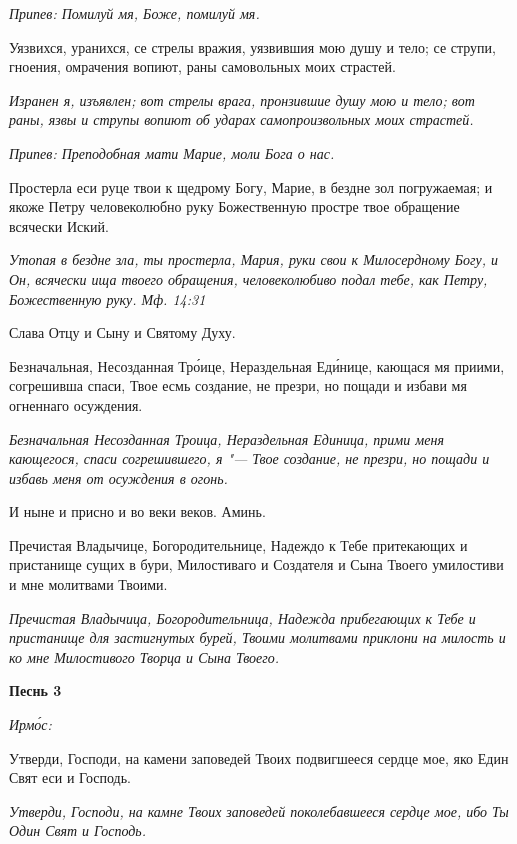 \itshape Припев:\normalfont{} Помилуй мя, Боже, помилуй мя.


Уязвихся, уранихся, се стрелы вражия, уязвившия мою душу и тело; се струпи, гноения, омрачения вопиют, раны самовольных моих страстей.


\itshape Изранен я, изъявлен; вот стрелы врага, пронзившие душу мою и тело; вот раны, язвы и струпы вопиют об ударах самопроизвольных моих страстей.\normalfont{}


\itshape Припев:\normalfont{} Преподобная мати Марие, моли Бога о нас.


Простерла еси руце твои к щедрому Богу, Марие, в бездне зол погружаемая; и якоже Петру человеколюбно руку Божественную простре твое обращение всячески Иский.


\itshape Утопая в бездне зла, ты простерла, Мария, руки свои к Милосердному Богу, и Он, всячески ища твоего обращения, человеколюбиво подал тебе, как Петру, Божественную руку. Мф. 14:31\normalfont{}


Слава Отцу и Сыну и Святому Духу.


Безначальная, Несозданная Тро́ице, Нераздельная Еди́нице, кающася мя приими, согрешивша спаси, Твое есмь создание, не презри, но пощади и избави мя огненнаго осуждения.


\itshape Безначальная Несозданная Троица, Нераздельная Единица, прими меня кающегося, спаси согрешившего, я "--- Твое создание, не презри, но пощади и избавь меня от осуждения в огонь.\normalfont{}


И ныне и присно и во веки веков. Аминь.


Пречистая Владычице, Богородительнице, Надеждо к Тебе притекающих и пристанище сущих в бури, Милостиваго и Создателя и Сына Твоего умилостиви и мне молитвами Твоими.


\itshape Пречистая Владычица, Богородительница, Надежда прибегающих к Тебе и пристанище для застигнутых бурей, Твоими молитвами приклони на милость и ко мне Милостивого Творца и Сына Твоего.\normalfont{}





\bfseries Песнь 3\normalfont{}


\itshape Ирмо́с:\normalfont{}


Утверди, Господи, на камени заповедей Твоих подвигшееся сердце мое, яко Един Свят еси и Господь.


\itshape Утверди, Господи, на камне Твоих заповедей поколебавшееся сердце мое, ибо Ты Один Свят и Господь.\normalfont{}


